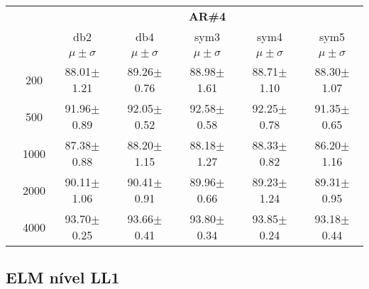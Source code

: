 \begin{table}[H]
\begin{tabular}{|c|c|c c c c c|}
\cline{3-7}
\multicolumn{2}{c|}{\multirow{3}{*}{}} & \multicolumn{5}{c|}{\textbf{AR\#4}}   \\\cline{3-7} 
\multicolumn{2}{c|}{}  & db2 & db4 & sym3 & sym4 & sym5 \\\cline{3-7}%
\multicolumn{2}{c|}{}& $\mu \pm \sigma$ & $\mu \pm \sigma$ & $\mu \pm \sigma$ & $\mu \pm \sigma$ & $\mu \pm \sigma$ \\\hline
&200	&88.01$\pm$1.21	&89.26$\pm$0.76	&88.98$\pm$1.61	&88.71$\pm$1.10	&88.30$\pm$1.07\\\cline{2-7}
&500	&91.96$\pm$0.89	&92.05$\pm$0.52	&92.58$\pm$0.58	&92.25$\pm$0.78	&91.35$\pm$0.65\\\cline{2-7}
&1000	&87.38$\pm$0.88	&88.20$\pm$1.15	&88.18$\pm$1.27	&88.33$\pm$0.82	&86.20$\pm$1.16\\\cline{2-7}
&2000	&90.11$\pm$1.06	&90.41$\pm$0.91	&89.96$\pm$0.66	&89.23$\pm$1.24	&89.31$\pm$0.95\\\cline{2-7}
&4000	&93.70$\pm$0.25	&93.66$\pm$0.41	&93.80$\pm$0.34	&93.85$\pm$0.24	&93.18$\pm$0.44
 \\\midrule


	\end{tabular}
\end{table}






\subsection{ELM nível LL1}



